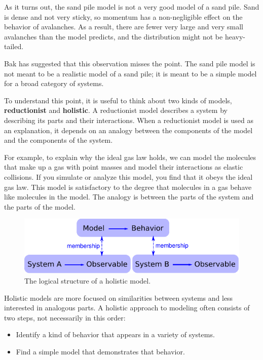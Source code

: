 \documentclass[12pt]{book}
\theoremstyle{exercise}
\begin{document}
As it turns out, the sand pile model is not a very good model of a
sand pile.  Sand is dense and not very sticky, so momentum has a
non-negligible effect on the behavior of avalanches.  As a result,
there are fewer very large and very small avalanches than the model
predicts, and the distribution might not be heavy-tailed.

Bak has suggested that this observation misses the point.
The sand pile model is not meant to be a realistic model of a sand
pile; it is meant to be a simple model for a broad category of
systems.

To understand this point, it is useful to think about two
kinds of models, {\bf reductionist} and {\bf holistic}.  A
reductionist model describes a system by describing its parts
and their interactions.  When a reductionist model is used
as an explanation, it depends on an analogy between the
components of the model and the components of the system.


For example, to explain why the ideal gas law holds, we can model the
molecules that make up a gas with point masses and model their
interactions as elastic collisions.  If you simulate or analyze this
model, you find that it obeys the ideal gas law.  This model is
satisfactory to the degree that molecules in a gas behave like
molecules in the model.  The analogy is between the parts of the
system and the parts of the model.


\begin{figure}
\centerline{\includegraphics[width=5in]{figs/model2.pdf}}
\caption{The logical structure of a holistic model.\label{fig.model2}}
\end{figure}

Holistic models are more focused on similarities between systems and
less interested in analogous parts.  A holistic approach to modeling
often consists of two steps, not necessarily in this order:


\begin{itemize}

\item Identify a kind of behavior that appears in a variety of
systems.

\item Find a simple model that demonstrates that behavior.

\end{itemize}
\end{document}

